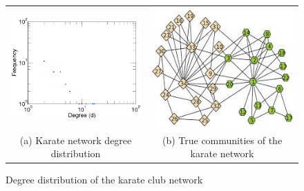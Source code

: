 \begin{figure}[!htb]
	\begin{tabular}{cc}
		\includegraphics[width=65mm]{images/zachary_degree_dist.png} &   \includegraphics[width=65mm]{images/karate_true.png} \\
(a) Karate network degree distribution & (b) True communities of the karate network \\[6pt]
	\end{tabular}
	\caption{Degree distribution of the karate club network\cite{Kunegis2013}}
	\label{logo}
\end{figure}



